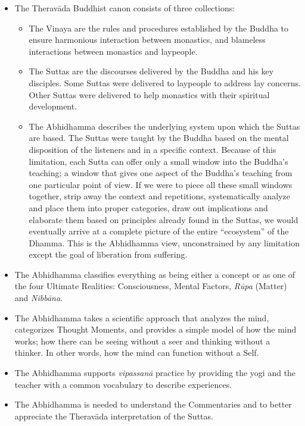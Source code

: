 \begin{itemize}

\item The Theravāda Buddhist canon consists of three collections:

\begin{itemize}

\item The Vinaya are the rules and procedures established by the Buddha to ensure harmonious interaction between monastics, and blameless interactions between monastics and laypeople.

\item The Suttas are the discourses delivered by the Buddha and his key disciples. Some Suttas were delivered to laypeople to address lay concerns. Other Suttas were delivered to help monastics with their spiritual development.

\item The Abhidhamma describes the underlying system upon which the Suttas are based. The Suttas were taught by the Buddha based on the mental disposition of the listeners and in a specific context. Because of this limitation, each Sutta can offer only a small window into the Buddha’s teaching; a window that gives one aspect of the Buddha’s teaching from one particular point of view. If we were to piece all these small windows together, strip away the context and repetitions, systematically analyze and place them into proper categories, draw out implications and elaborate them based on principles already found in the Suttas, we would eventually arrive at a complete picture of the entire “ecosystem” of the Dhamma. This is the Abhidhamma view, unconstrained by any limitation except the goal of liberation from suffering.

\end{itemize}

\item The Abhidhamma classifies everything as being either a concept or as one of the four Ultimate Realities: Consciousness, Mental Factors, \textit{Rūpa} (Matter) and \textit{Nibbāna}.

\item The Abhidhamma takes a scientific approach that analyzes the mind, categorizes Thought Moments, and provides a simple model of how the mind works; how there can be seeing without a seer and thinking without a thinker. In other words, how the mind can function without a Self.

\item The Abhidhamma supports \textit{vipassanā} practice by providing the yogi and the teacher with a common vocabulary to describe experiences.

\item The Abhidhamma is needed to understand the Commentaries and to better appreciate the Theravāda interpretation of the Suttas.

\end{itemize}

